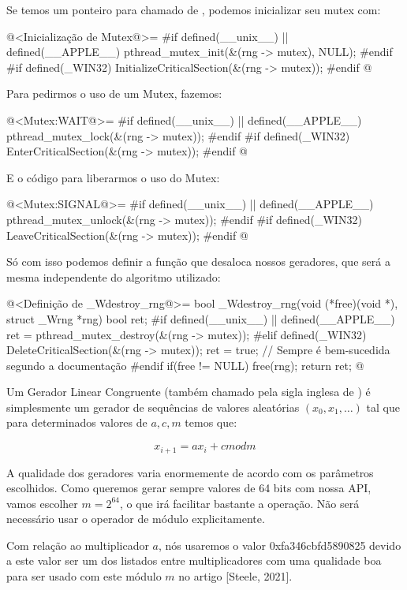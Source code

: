 Se temos um ponteiro para  chamado
de , podemos inicializar seu mutex com:

\iniciocodigo
@<Inicialização de Mutex@>=
#if defined(__unix__) || defined(__APPLE__)
pthread_mutex_init(&(rng -> mutex), NULL);
#endif
#if defined(_WIN32)
InitializeCriticalSection(&(rng -> mutex));
#endif
@
\fimcodigo

Para pedirmos o uso de um Mutex, fazemos:

\iniciocodigo
@<Mutex:WAIT@>=
#if defined(__unix__) || defined(__APPLE__)
pthread_mutex_lock(&(rng -> mutex));
#endif
#if defined(_WIN32)
EnterCriticalSection(&(rng -> mutex));
#endif
@
\fimcodigo

E o código para liberarmos o uso do Mutex:

\iniciocodigo
@<Mutex:SIGNAL@>=
#if defined(__unix__) || defined(__APPLE__)
pthread_mutex_unlock(&(rng -> mutex));
#endif
#if defined(_WIN32)
LeaveCriticalSection(&(rng -> mutex));
#endif
@
\fimcodigo

Só com isso podemos definir a função que desaloca nossos geradores,
que será a mesma independente do algoritmo utilizado:

\iniciocodigo
@<Definição de \_Wdestroy\_rng@>=
bool _Wdestroy_rng(void (*free)(void *), struct _Wrng *rng){
  bool ret;
#if defined(__unix__) || defined(__APPLE__)
  ret = pthread_mutex_destroy(&(rng -> mutex));
#elif defined(_WIN32)
  DeleteCriticalSection(&(rng -> mutex));
  ret = true; // Sempre é bem-sucedida segundo a documentação
#endif
  if(free != NULL)
    free(rng);
  return ret;
}
@
\fimcodigo



Um Gerador Linear Congruente (também chamado pela sigla inglesa
de ) é simplesmente um gerador de
sequências de valores aleatórias $(x_0, x_1, \ldots)$ tal que para
determinados valores de $a, c, m$ temos que:

$$
x_{i+1}=ax_i+c mod m
$$

A qualidade dos geradores varia enormemente de acordo com os
parâmetros escolhidos. Como queremos gerar sempre valores de 64 bits
com nossa API, vamos escolher $m=2^{64}$, o que irá facilitar bastante
a operação. Não será necessário usar o operador de módulo
explicitamente.

Com relação ao multiplicador $a$, nós usaremos o valor
0xfa346cbfd5890825 devido a este valor ser um dos listados entre
multiplicadores com uma qualidade boa para ser usado com este módulo
$m$ no artigo [Steele, 2021].


